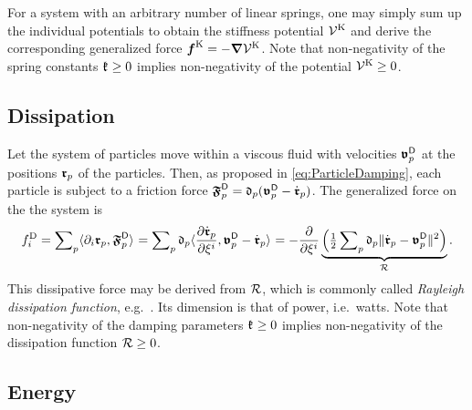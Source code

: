For a system with an arbitrary number of linear springs, one may simply sum up the individual potentials to obtain the stiffness potential $\potentialStiff$ and derive the corresponding generalized force $\genForceStiff = -\differential \potentialStiff$. 
Note that non-negativity of the spring constants $\particleStiffness{} \geq 0$ implies non-negativity of the potential $\potentialStiff \geq 0$.



\subsection{Dissipation}
Let the system of particles move within a viscous fluid with velocities $\fluidVel{\PidxI}$ at the positions $\particlePos{\PidxI}$ of the particles.
Then, as proposed in \eqref{eq:ParticleDamping}, each particle is subject to a friction force $\particleForceDiss{\PidxI} = \particleDamping{\PidxI} (\fluidVel{\PidxI} - \particlePosd{\PidxI})$.
The generalized force on the the system is
\begin{align}
 \genForceDissCoeff{\LidxI}
 = \sumParticles \sProd{\dirDiff{\LidxI} \particlePos{\PidxI}}{\particleForceDiss{\PidxI}}
 = \sumParticles \particleDamping{\PidxI} \sProd{\pdiff[\particlePosd{\PidxI}]{\sysVelCoeff{\LidxI}}}{\fluidVel{\PidxI} - \particlePosd{\PidxI}}
 = -\pdiff{\sysVelCoeff{\LidxI}} \underbrace{\Big( \tfrac{1}{2} \sumParticles \particleDamping{\PidxI} \norm{\particlePosd{\PidxI} - \fluidVel{\PidxI}}^2 \Big)}_{\dissFkt}.
\end{align}
This dissipative force may be derived from $\dissFkt$, which is commonly called \textit{Rayleigh dissipation function}, e.g.\ \cite[p.\ 24]{Goldstein:ClassicalMechanics}.
Its dimension is that of power, i.e.\ watts.
Note that non-negativity of the damping parameters $\particleStiffness{} \geq 0$ implies non-negativity of the dissipation function $\dissFkt \geq 0$.


\subsection{Energy}
